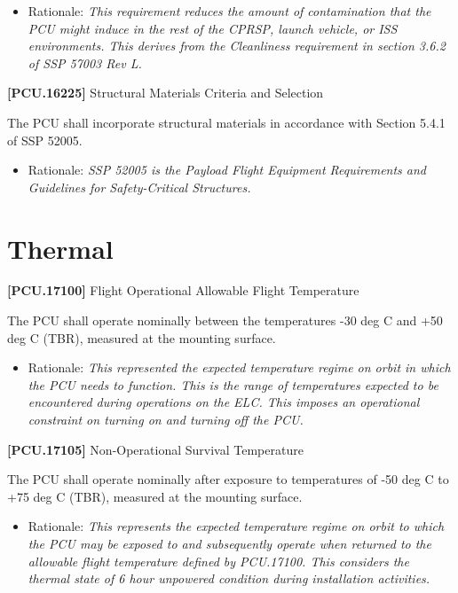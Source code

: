 \begin{itemize}
\item{} Rationale: \emph{This requirement reduces the amount of contamination that the PCU might induce in the rest of the CPRSP, launch vehicle, or ISS environments. This derives from the Cleanliness requirement in section 3.6.2 of SSP 57003 Rev L.}

\end{itemize}

\textbf{[PCU.16225]} Structural Materials Criteria and Selection

The \gls{PCU} shall incorporate structural materials in accordance with Section 5.4.1 of SSP 52005.

\begin{itemize}
\item{} Rationale: \emph{SSP 52005 is the Payload Flight Equipment Requirements and Guidelines for Safety-Critical Structures.}

\end{itemize}

\section{Thermal}
\label{thermal}

\textbf{[PCU.17100]} Flight Operational Allowable Flight Temperature

The \gls{PCU} shall operate nominally between the temperatures -30 deg C and +50 deg C (TBR\label{tbx_19}), measured at the mounting surface.

\begin{itemize}
\item{} Rationale: \emph{This represented the expected temperature regime on orbit in which the PCU needs to function. This is the range of temperatures expected to be encountered during operations on the ELC. This imposes an operational constraint on turning on and turning off the PCU.}

\end{itemize}

\textbf{[PCU.17105]} Non-Operational Survival Temperature

The \gls{PCU} shall operate nominally after exposure to temperatures of -50 deg C to +75 deg C (TBR\label{tbx_20}), measured at the mounting surface.

\begin{itemize}
\item{} Rationale: \emph{This represents the expected temperature regime on orbit to which the PCU may be exposed to and subsequently operate when returned to the allowable flight temperature defined by PCU.17100. This considers the thermal state of 6 hour unpowered condition during installation activities.}

\end{itemize}

